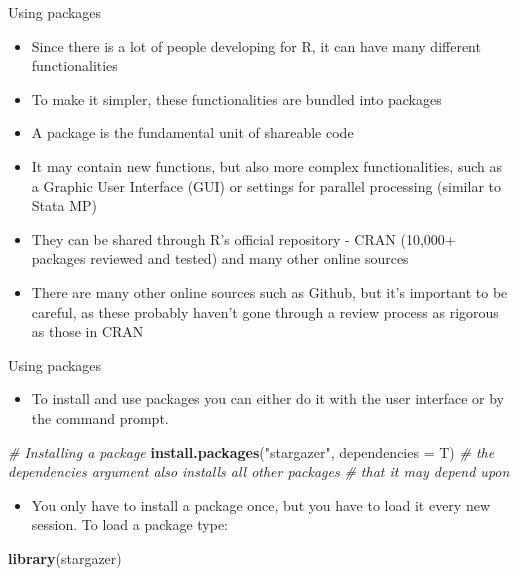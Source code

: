 \documentclass[ignorenonframetext,]{beamer}
\newenvironment{Shaded}{\begin{snugshade}}{\end{snugshade}}
\newcommand{\KeywordTok}[1]{\textcolor[rgb]{0.13,0.29,0.53}{\textbf{#1}}}
\newcommand{\DataTypeTok}[1]{\textcolor[rgb]{0.13,0.29,0.53}{#1}}
\newcommand{\StringTok}[1]{\textcolor[rgb]{0.31,0.60,0.02}{#1}}
\newcommand{\CommentTok}[1]{\textcolor[rgb]{0.56,0.35,0.01}{\textit{#1}}}
\newcommand{\NormalTok}[1]{#1}
\providecommand{\tightlist}{%
  \setlength{\itemsep}{0pt}\setlength{\parskip}{0pt}}
\begin{document}
\begin{frame}{Using packages}

\begin{itemize}
\tightlist
\item
  Since there is a lot of people developing for R, it can have many
  different functionalities
\item
  To make it simpler, these functionalities are bundled into packages
\item
  A package is the fundamental unit of shareable code
\item
  It may contain new functions, but also more complex functionalities,
  such as a Graphic User Interface (GUI) or settings for parallel
  processing (similar to Stata MP)
\item
  They can be shared through R's official repository - CRAN (10,000+
  packages reviewed and tested) and many other online sources
\item
  There are many other online sources such as Github, but it's important
  to be careful, as these probably haven't gone through a review process
  as rigorous as those in CRAN
\end{itemize}

\end{frame}

\begin{frame}[fragile]{Using packages}

\begin{itemize}
\tightlist
\item
  To install and use packages you can either do it with the user
  interface or by the command prompt.
\end{itemize}

\begin{Shaded}
\begin{Highlighting}[]
\CommentTok{# Installing a package}
\KeywordTok{install.packages}\NormalTok{(}\StringTok{"stargazer"}\NormalTok{,}
                 \DataTypeTok{dependencies =}\NormalTok{ T)}
\CommentTok{# the dependencies argument also installs all other packages}
\CommentTok{# that it may depend upon}
\end{Highlighting}
\end{Shaded}

\begin{itemize}
\tightlist
\item
  You only have to install a package once, but you have to load it every
  new session. To load a package type:
\end{itemize}

\begin{Shaded}
\begin{Highlighting}[]
\KeywordTok{library}\NormalTok{(stargazer)}
\end{Highlighting}
\end{Shaded}

\end{frame}
\end{document}
